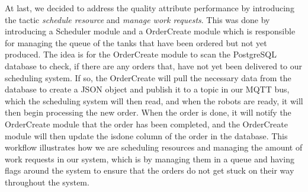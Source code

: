 At last, we decided to address the quality attribute performance by introducing the tactic \emph{schedule resource} and \emph{manage work requests}\cite{lenbassArchi}. This was done by introducing a Scheduler module and a OrderCreate module which is responsible for managing the queue of the tanks that have been ordered but not yet produced. The idea is for the OrderCreate module to scan the PostgreSQL database to check, if there are any orders that, have not yet been delivered to our scheduling system. If so, the OrderCreate will pull the necessary data from the database to create a JSON object and publish it to a topic in our MQTT bus, which the scheduling system will then read, and when the robots are ready, it will then begin processing the new order. When the order is done, it will notify the OrderCreate module that the order has been completed, and the OrderCreate module will then update the isdone column of the order in the database. This workflow illustrates how we are scheduling resources and managing the amount of work requests in our system, which is by managing them in a queue and having flags around the system to ensure that the orders do not get stuck on their way throughout the system. 
